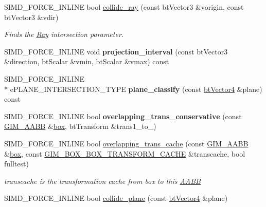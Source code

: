 \begin{DoxyCompactItemize}
\item 
S\+I\+M\+D\+\_\+\+F\+O\+R\+C\+E\+\_\+\+I\+N\+L\+I\+N\+E bool \hyperlink{class_g_i_m___a_a_b_b_a1fafc37703d288fd0fe862b861829287}{collide\+\_\+ray} (const bt\+Vector3 \&vorigin, const bt\+Vector3 \&vdir)
\begin{DoxyCompactList}\small\item\em Finds the \hyperlink{class_ray}{Ray} intersection parameter. \end{DoxyCompactList}\item 
\hypertarget{class_g_i_m___a_a_b_b_ad80bab932aabb191c1873c3dc34cbac9}{S\+I\+M\+D\+\_\+\+F\+O\+R\+C\+E\+\_\+\+I\+N\+L\+I\+N\+E void {\bfseries projection\+\_\+interval} (const bt\+Vector3 \&direction, bt\+Scalar \&vmin, bt\+Scalar \&vmax) const }\label{class_g_i_m___a_a_b_b_ad80bab932aabb191c1873c3dc34cbac9}

\item 
\hypertarget{class_g_i_m___a_a_b_b_a641e77aa89b73949a92cb012a4f3aa42}{S\+I\+M\+D\+\_\+\+F\+O\+R\+C\+E\+\_\+\+I\+N\+L\+I\+N\+E \\*
e\+P\+L\+A\+N\+E\+\_\+\+I\+N\+T\+E\+R\+S\+E\+C\+T\+I\+O\+N\+\_\+\+T\+Y\+P\+E {\bfseries plane\+\_\+classify} (const \hyperlink{classbt_vector4}{bt\+Vector4} \&plane) const }\label{class_g_i_m___a_a_b_b_a641e77aa89b73949a92cb012a4f3aa42}

\item 
\hypertarget{class_g_i_m___a_a_b_b_a9f15bee8c497a7c09221a07ad0f01695}{S\+I\+M\+D\+\_\+\+F\+O\+R\+C\+E\+\_\+\+I\+N\+L\+I\+N\+E bool {\bfseries overlapping\+\_\+trans\+\_\+conservative} (const \hyperlink{class_g_i_m___a_a_b_b}{G\+I\+M\+\_\+\+A\+A\+B\+B} \&\hyperlink{structbox}{box}, bt\+Transform \&trans1\+\_\+to\+\_)}\label{class_g_i_m___a_a_b_b_a9f15bee8c497a7c09221a07ad0f01695}

\item 
\hypertarget{class_g_i_m___a_a_b_b_af4c6c48e03d316e74e00b2ab261fd125}{S\+I\+M\+D\+\_\+\+F\+O\+R\+C\+E\+\_\+\+I\+N\+L\+I\+N\+E bool \hyperlink{class_g_i_m___a_a_b_b_af4c6c48e03d316e74e00b2ab261fd125}{overlapping\+\_\+trans\+\_\+cache} (const \hyperlink{class_g_i_m___a_a_b_b}{G\+I\+M\+\_\+\+A\+A\+B\+B} \&\hyperlink{structbox}{box}, const \hyperlink{class_g_i_m___b_o_x___b_o_x___t_r_a_n_s_f_o_r_m___c_a_c_h_e}{G\+I\+M\+\_\+\+B\+O\+X\+\_\+\+B\+O\+X\+\_\+\+T\+R\+A\+N\+S\+F\+O\+R\+M\+\_\+\+C\+A\+C\+H\+E} \&transcache, bool fulltest)}\label{class_g_i_m___a_a_b_b_af4c6c48e03d316e74e00b2ab261fd125}

\begin{DoxyCompactList}\small\item\em transcache is the transformation cache from box to this \hyperlink{class_a_a_b_b}{A\+A\+B\+B} \end{DoxyCompactList}\item 
\hypertarget{class_g_i_m___a_a_b_b_a05940e89bdd3fa59cc8cd3af6e1b876c}{S\+I\+M\+D\+\_\+\+F\+O\+R\+C\+E\+\_\+\+I\+N\+L\+I\+N\+E bool \hyperlink{class_g_i_m___a_a_b_b_a05940e89bdd3fa59cc8cd3af6e1b876c}{collide\+\_\+plane} (const \hyperlink{classbt_vector4}{bt\+Vector4} \&plane)}\label{class_g_i_m___a_a_b_b_a05940e89bdd3fa59cc8cd3af6e1b876c}


\end{DoxyCompactItemize}

